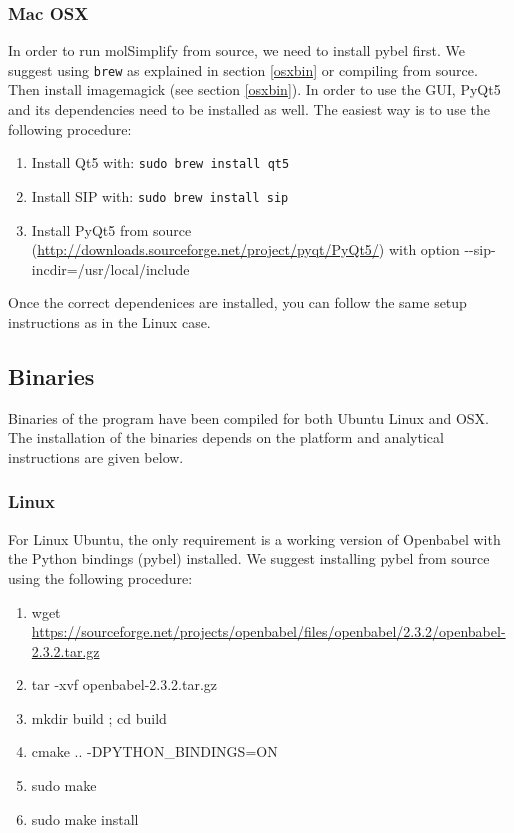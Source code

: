 \subsubsection{Mac OSX}

In order to run molSimplify from source, we need to install pybel first. We suggest using \texttt{brew} as explained in section \ref{osxbin} or compiling from source. Then install imagemagick (see section \ref{osxbin}). In order to use the GUI, PyQt5 and its dependencies need to be installed as well. The easiest way is to use the following procedure:

\begin{enumerate}
\item Install Qt5 with: \texttt{sudo brew install qt5}
\item Install SIP with: \texttt{sudo brew install sip}
\item Install PyQt5 from source (\url{http://downloads.sourceforge.net/project/pyqt/PyQt5/}) with option -\hspace{0.02cm}-sip-incdir=/usr/local/include
\end{enumerate}

Once the correct dependenices are installed, you can follow the same setup instructions as in the Linux case.

\subsection{Binaries}

Binaries of the program have been compiled for both Ubuntu Linux and OSX. The installation of the binaries depends on the platform and analytical instructions are given below.

\subsubsection{Linux}\label{linbin}

For Linux Ubuntu, the only requirement is a working version of Openbabel with the Python bindings (pybel) installed. We suggest installing pybel from source using the following procedure:
\begin{enumerate}
\item   wget \url{https://sourceforge.net/projects/openbabel/files/openbabel/2.3.2/openbabel-2.3.2.tar.gz}
\item  tar -xvf openbabel-2.3.2.tar.gz 
\item mkdir build ; cd build
\item cmake .. -DPYTHON\_BINDINGS=ON
\item sudo make
\item sudo make install
\end{enumerate}

